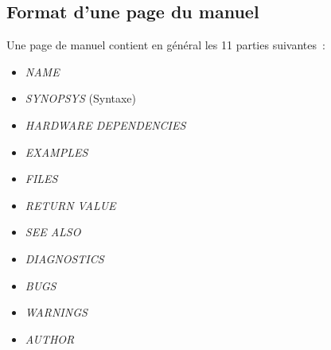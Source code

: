 \subsection{Format d'une page du manuel}

Une page de manuel contient en g{\'e}n{\'e}ral les 11 parties suivantes~:
\begin{itemize}
	\item {\sl NAME}
	\item {\sl SYNOPSYS} (Syntaxe)
	\item {\sl HARDWARE DEPENDENCIES}
	\item {\sl EXAMPLES}
	\item {\sl FILES}
	\item {\sl RETURN VALUE}
	\item {\sl SEE ALSO}
	\item {\sl DIAGNOSTICS}
	\item {\sl BUGS}
	\item {\sl WARNINGS}
	\item {\sl AUTHOR}
\end{itemize}

